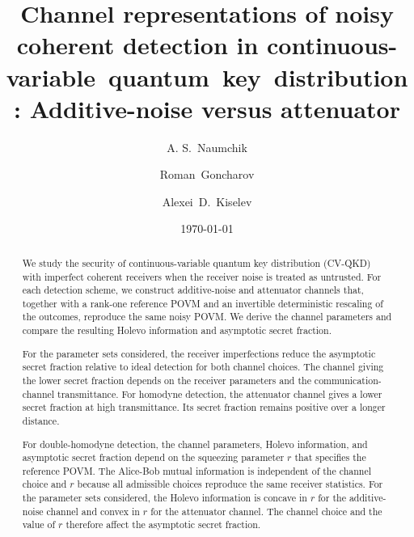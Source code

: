 \documentclass[%
final, 
superscriptaddress,
 amsmath,amssymb,amsfonts,
 aps,
 pra,
 longbibliography,
]{revtex4-2}
\begin{document}
\title{
  Channel representations of noisy coherent detection in continuous-variable~quantum~key~distribution: Additive-noise versus attenuator
}

\author{A. S.~Naumchik}


\author{Roman~Goncharov}


\author{Alexei~D.~Kiselev}


\date{\today}


\begin{abstract}
We study the security of continuous-variable quantum key distribution (CV-QKD) with imperfect coherent receivers when the receiver noise is treated as untrusted. For each detection scheme, we construct additive-noise and attenuator channels that, together with a rank-one reference POVM and an invertible deterministic rescaling of the outcomes, reproduce the same noisy POVM. We derive the channel parameters and compare the resulting Holevo information and asymptotic secret fraction.

For the parameter sets considered, the receiver imperfections reduce the asymptotic secret fraction relative to ideal detection for both channel choices. The channel giving the lower secret fraction depends on the receiver parameters and the communication-channel transmittance. For homodyne detection, the attenuator channel gives a lower secret fraction at high transmittance. Its secret fraction remains positive over a longer distance.

For double-homodyne detection, the channel parameters, Holevo information, and asymptotic secret fraction depend on the squeezing parameter $r$ that specifies the reference POVM. The Alice-Bob mutual information is independent of the channel choice and $r$ because all admissible choices reproduce the same receiver statistics. For the parameter sets considered, the Holevo information is concave in $r$ for the additive-noise channel and convex in $r$ for the attenuator channel. The channel choice and the value of $r$ therefore affect the asymptotic secret fraction.
\end{abstract}
\end{document}
